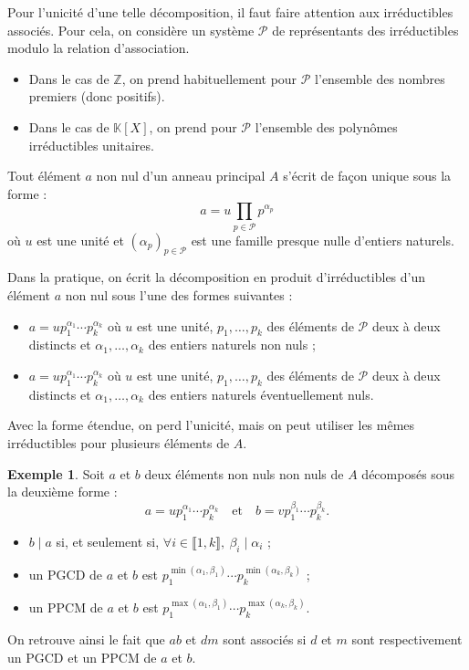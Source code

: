 \documentclass[french]{article}
\newcommand{\Z}{\mathbb{Z}}
\newcommand{\K}{\mathbb{K}}
\theoremstyle{plain}
\theoremstyle{definition}
\newtheorem*{ex}{Exemple}
\theoremstyle{remark}
\begin{document}
Pour l'unicité d'une telle décomposition, il faut faire attention aux irréductibles associés. Pour cela, on considère un système $\mathcal{P}$ de représentants des irréductibles modulo la relation d'association.
\begin{itemize}
	\item Dans le cas de $\Z$, on prend habituellement pour $\mathcal{P}$ l'ensemble des nombres premiers (donc positifs).
	\item Dans le cas de $\K[X]$, on prend pour $\mathcal{P}$ l'ensemble des polynômes irréductibles unitaires.
\end{itemize}

\begin{thm}%
	Tout élément $a$ non nul d'un anneau principal $A$ s'écrit de façon unique sous la forme :
	$$a=u\prod_{p\in\mathcal{P}}p^{\alpha_p}$$ où $u$ est une unité et $(\alpha_p)_{p\in\mathcal{P}}$ est une famille presque nulle d'entiers naturels.
\end{thm}

\begin{met}
	Dans la pratique, on écrit la décomposition en produit d'irréductibles d'un élément $a$ non nul sous l'une des formes suivantes :
	\begin{itemize}
		\item $a=up_1^{\alpha_1}\cdots p_k^{\alpha_k}$ où $u$ est une unité, $p_1,\ldots,p_k$ des éléments de $\mathcal{P}$ deux à deux distincts et $\alpha_1,\ldots,\alpha_k$ des entiers naturels non nuls ;
		\item $a=up_1^{\alpha_1}\cdots p_k^{\alpha_k}$ où $u$ est une unité, $p_1,\ldots,p_k$ des éléments de $\mathcal{P}$ deux à deux distincts et $\alpha_1,\ldots,\alpha_k$ des entiers naturels éventuellement nuls.
	\end{itemize} Avec la forme étendue, on perd l'unicité, mais on peut utiliser les mêmes irréductibles pour plusieurs éléments de $A$.
\end{met}

\begin{ex}
	Soit $a$ et $b$ deux éléments non nuls non nuls de $A$ décomposés sous la deuxième forme :
	$$a=up_1^{\alpha_1}\cdots p_k^{\alpha_k}\quad\text{et}\quad b=vp_1^{\beta_1}\cdots p_k^{\beta_k}.$$
	\begin{itemize}
		\item $b\mid a$ si, et seulement si, $\forall i\in\llbracket1,k\rrbracket,\ \beta_i\mid\alpha_i$ ;
		\item un PGCD de $a$ et $b$ est $p_1^{\min(\alpha_1,\beta_1)}\cdots p_k^{\min(\alpha_k,\beta_k)}$ ;
		\item un PPCM de $a$ et $b$ est $p_1^{\max(\alpha_1,\beta_1)}\cdots p_k^{\max(\alpha_k,\beta_k)}$.
	\end{itemize}
	On retrouve ainsi le fait que $ab$ et $dm$ sont associés si $d$ et $m$ sont respectivement un PGCD et un PPCM de $a$ et $b$.
\end{ex}
\end{document}
